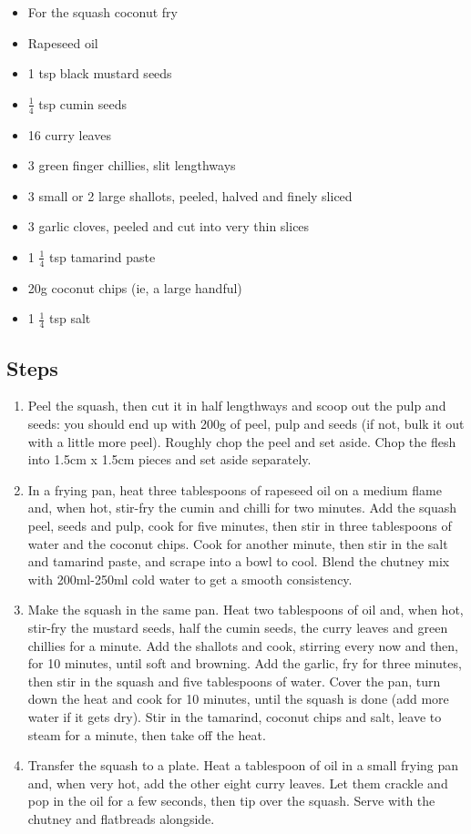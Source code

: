 \documentclass{book}
\begin{document}
\begin{itemize}
\item For the squash coconut fry
\item Rapeseed oil
\item 1 tsp black mustard seeds
\item $\frac{1}{4}$ tsp cumin seeds
\item 16 curry leaves
\item 3 green finger chillies, slit lengthways
\item 3 small or 2 large shallots, peeled, halved and finely sliced
\item 3 garlic cloves, peeled and cut into very thin slices
\item 1 $\frac{1}{4}$ tsp tamarind paste
\item 20g coconut chips (ie, a large handful)
\item 1 $\frac{1}{4}$ tsp salt
\end{itemize}

\subsection*{Steps}
\begin{enumerate}
\item Peel the squash, then cut it in half lengthways and scoop out the pulp and seeds: you should end up with 200g of peel, pulp and seeds (if not, bulk it out with a little more peel). Roughly chop the peel and set aside. Chop the flesh into 1.5cm x 1.5cm pieces and set aside separately.
\item In a frying pan, heat three tablespoons of rapeseed oil on a medium flame and, when hot, stir-fry the cumin and chilli for two minutes. Add the squash peel, seeds and pulp, cook for five minutes, then stir in three tablespoons of water and the coconut chips. Cook for another minute, then stir in the salt and tamarind paste, and scrape into a bowl to cool. Blend the chutney mix with 200ml-250ml cold water to get a smooth consistency.
\item Make the squash in the same pan. Heat two tablespoons of oil and, when hot, stir-fry the mustard seeds, half the cumin seeds, the curry leaves and green chillies for a minute. Add the shallots and cook, stirring every now and then, for 10 minutes, until soft and browning. Add the garlic, fry for three minutes, then stir in the squash and five tablespoons of water. Cover the pan, turn down the heat and cook for 10 minutes, until the squash is done (add more water if it gets dry). Stir in the tamarind, coconut chips and salt, leave to steam for a minute, then take off the heat.
\item Transfer the squash to a plate. Heat a tablespoon of oil in a small frying pan and, when very hot, add the other eight curry leaves. Let them crackle and pop in the oil for a few seconds, then tip over the squash. Serve with the chutney and flatbreads alongside.
\end{enumerate}
\newpage
\end{document}
